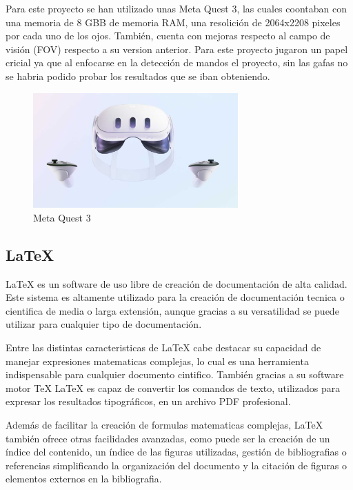 \documentclass[a4paper, 12pt]{book}
\begin{document}
Para este proyecto se han utilizado unas Meta Quest 3, las cuales coontaban con una memoria de 8 GBB de memoria RAM, una resolición de 2064x2208 pixeles por cada uno de los ojos. También, cuenta con mejoras respecto al campo de visión (FOV) respecto a su version anterior. Para este proyecto jugaron un papel cricial ya que al enfocarse en la detección de mandos
el proyecto, sin las gafas no se habria podido probar los resultados que se iban obteniendo.

\begin{figure}[H] 
  \centering
  \includegraphics[width=0.7\textwidth]{img/meta_quest.jpg}
  \caption{Meta Quest 3}
  \label{fig:metaquest}
\end{figure}

\subsection{LaTeX}
\label{subsec:latex}

LaTeX \cite{latexproject_about} es un software de uso libre de creación de documentación de alta calidad. Este sistema es altamente utilizado para la creación de documentación tecnica o cientifica de media o larga extensión, aunque gracias a su versatilidad se puede utilizar para cualquier tipo de documentación.

Entre las distintas caracteristicas de LaTeX cabe destacar su capacidad de manejar expresiones matematicas complejas, lo cual es una herramienta indispensable para cualquier documento cintifico. También gracias a su software motor TeX LaTeX es capaz de convertir los comandos de texto, utilizados para expresar los resultados tipográficos, en un archivo PDF profesional. 

Además de facilitar la creación de formulas matematicas complejas, LaTeX también ofrece otras facilidades avanzadas, como puede ser la creación de un índice del contenido, un índice de las figuras utilizadas, gestión de bibliografias o referencias simplificando la organización del documento y la citación de figuras o elementos externos en la bibliografia.
\end{document}
